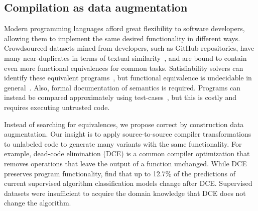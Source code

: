 \documentclass{article}
\begin{document}
\subsection{Compilation as data augmentation} \label{sec:data_aug}

Modern programming languages afford great flexibility to software developers, allowing them to implement the same desired functionality in different ways. Crowdsourced datasets mined from developers, such as GitHub repositories, have many near-duplicates in terms of textual similarity~\citep{10.1145/3359591.3359735}, and are bound to contain even more functional equivalences for common tasks. Satisfiability solvers can identify these equivalent programs~\citep{10.1145/512529.512566, 10.1145/1168857.1168906}, but functional equivalence is undecidable in general~\citep{rice1953classes}. Also, formal documentation of semantics is required. Programs can instead be compared approximately using test-cases~\citep{massalin1987superoptimizer}, but this is costly and requires executing untrusted code.

Instead of searching for equivalences, we propose correct by construction data augmentation. Our insight is to apply source-to-source compiler transformations to unlabeled code to generate many variants with the same functionality.
For example, dead-code elimination (DCE) is a common compiler optimization that removes operations that leave the output of a function unchanged. While DCE preserves program functionality, \citet{wang2019coset} find that up to 12.7\% of the predictions of current supervised algorithm classification models change after DCE. Supervised datasets were insufficient to acquire the domain knowledge that DCE does not change the algorithm.
\end{document}
